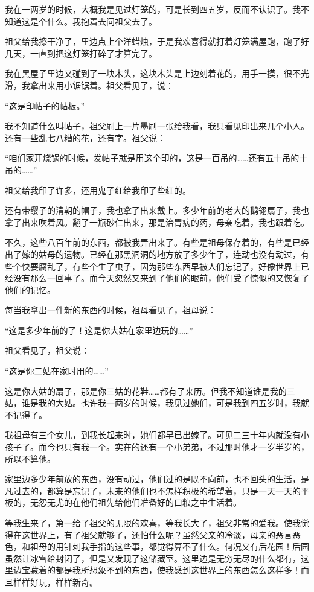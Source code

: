\par 我在一两岁的时候，大概我是见过灯笼的，可是长到四五岁，反而不认识了。我不知道这是个什么。我抱着去问祖父去了。
\par 祖父给我擦干净了，里边点上个洋蜡烛，于是我欢喜得就打着灯笼满屋跑，跑了好几天，一直到把这灯笼打碎了才算完了。
\par 我在黑屋子里边又碰到了一块木头，这块木头是上边刻着花的，用手一摸，很不光滑，我拿出来用小锯锯着。祖父看见了，说：
\par “这是印帖子的帖板。”
\par 我不知道什么叫帖子，祖父刷上一片墨刷一张给我看，我只看见印出来几个小人。还有一些乱七八糟的花，还有字。祖父说：
\par “咱们家开烧锅的时候，发帖子就是用这个印的，这是一百吊的……还有五十吊的十吊的……”
\par 祖父给我印了许多，还用鬼子红给我印了些红的。
\par 还有带缨子的清朝的帽子，我也拿了出来戴上。多少年前的老大的鹅翎扇子，我也拿了出来吹着风。翻了一瓶砂仁出来，那是治胃病的药，母亲吃着，我也跟着吃。
\par 不久，这些八百年前的东西，都被我弄出来了。有些是祖母保存着的，有些是已经出了嫁的姑母的遗物。已经在那黑洞洞的地方放了多少年了，连动也没有动过，有些个快要腐乱了，有些个生了虫子，因为那些东西早被人们忘记了，好像世界上已经没有那么一回事了。而今天忽然又来到了他们的眼前，他们受了惊似的又恢复了他们的记忆。
\par 每当我拿出一件新的东西的时候，祖母看见了，祖母说：
\par “这是多少年前的了！这是你大姑在家里边玩的……”
\par 祖父看见了，祖父说：
\par “这是你二姑在家时用的……”
\par 这是你大姑的扇子，那是你三姑的花鞋……都有了来历。但我不知道谁是我的三姑，谁是我的大姑。也许我一两岁的时候，我见过她们，可是我到四五岁时，我就不记得了。
\par 我祖母有三个女儿，到我长起来时，她们都早已出嫁了。可见二三十年内就没有小孩子了。而今也只有我一个。实在的还有一个小弟弟，不过那时他才一岁半岁的，所以不算他。
\par 家里边多少年前放的东西，没有动过，他们过的是既不向前，也不回头的生活，是凡过去的，都算是忘记了，未来的他们也不怎样积极的希望着，只是一天一天的平板的，无怨无尤的在他们祖先给他们准备好的口粮之中生活着。
\par 等我生来了，第一给了祖父的无限的欢喜，等我长大了，祖父非常的爱我。使我觉得在这世界上，有了祖父就够了，还怕什么呢？虽然父亲的冷淡，母亲的恶言恶色，和祖母的用针刺我手指的这些事，都觉得算不了什么。何况又有后花园！后园虽然让冰雪给封闭了，但是又发现了这储藏室。这里边是无穷无尽的什么都有，这里边宝藏着的都是我所想象不到的东西，使我感到这世界上的东西怎么这样多！而且样样好玩，样样新奇。
